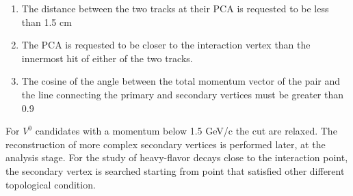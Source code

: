 \documentclass[12pt,a4paper]{book}
\begin{document}
	 \begin{enumerate}
	 	\item The distance between the two tracks at their PCA is requested to be less than 1.5 cm
	 	\item The PCA is requested to be closer to the interaction vertex than the innermost hit of either of the two tracks.
	 	\item The cosine of the angle between the total momentum vector of the
	 	pair and the line connecting the primary and secondary vertices must be greater than 0.9
	 \end{enumerate} 
	 For $V^0$ candidates with a momentum below 1.5 GeV/c the cut are relaxed. The reconstruction of more complex secondary vertices is performed later, at the analysis stage. For the study of heavy-flavor decays close to the interaction point, the secondary vertex is searched starting from point that satisfied other different topological condition. \cite{ALICE:2014sbx}
	
\end{document}
